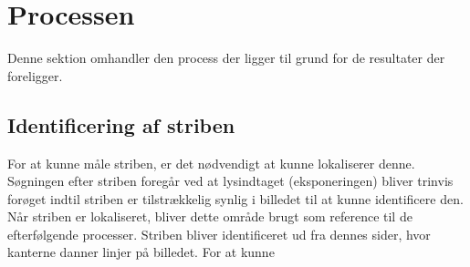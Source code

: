 \section{Processen}

Denne sektion omhandler den process der ligger til grund for de resultater der foreligger.

\subsection{Identificering af striben}
For at kunne måle striben, er det nødvendigt at kunne lokaliserer denne. Søgningen efter striben foregår ved at lysindtaget (eksponeringen) bliver trinvis forøget indtil striben er tilstrækkelig synlig i billedet til at kunne identificere den. Når striben er lokaliseret, bliver dette område brugt som reference til de efterfølgende processer. Striben bliver identificeret ud fra dennes sider, hvor kanterne danner linjer på billedet. For at kunne
